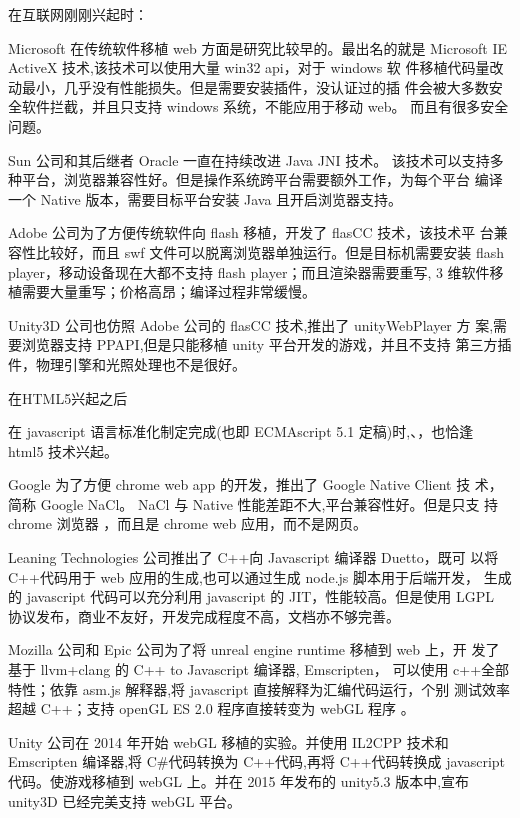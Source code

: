 在互联网刚刚兴起时：

Microsoft 在传统软件移植 web 方面是研究比较早的。最出名的就是
Microsoft IE ActiveX 技术,该技术可以使用大量 win32 api，对于 windows 软
件移植代码量改动最小，几乎没有性能损失。但是需要安装插件，没认证过的插
件会被大多数安全软件拦截，并且只支持 windows 系统，不能应用于移动 web。
而且有很多安全问题。

Sun 公司和其后继者 Oracle 一直在持续改进 Java JNI  技术。
该技术可以支持多种平台，浏览器兼容性好。但是操作系统跨平台需要额外工作，为每个平台
编译一个 Native 版本，需要目标平台安装 Java 且开启浏览器支持。

Adobe 公司为了方便传统软件向 flash 移植，开发了 flasCC 技术，该技术平
台兼容性比较好，而且 swf 文件可以脱离浏览器单独运行。但是目标机需要安装
flash player，移动设备现在大都不支持 flash player；而且渲染器需要重写,
3 维软件移植需要大量重写；价格高昂；编译过程非常缓慢。

Unity3D 公司也仿照 Adobe 公司的 flasCC 技术,推出了 unityWebPlayer 方
案,需要浏览器支持 PPAPI,但是只能移植 unity 平台开发的游戏，并且不支持
第三方插件，物理引擎和光照处理也不是很好。

在HTML5兴起之后

在 javascript 语言标准化制定完成(也即 ECMAscript 5.1 定稿)时,、，也恰逢
html5 技术兴起。

Google 为了方便 chrome web app 的开发，推出了 Google Native Client 技
术，简称 Google NaCl。
NaCl 与 Native 性能差距不大,平台兼容性好。但是只支
持 chrome 浏览器 ，而且是 chrome web 应用，而不是网页。

Leaning Technologies 公司推出了 C++向 Javascript 编译器 Duetto，既可
以将 C++代码用于 web 应用的生成,也可以通过生成 node.js 脚本用于后端开发，
生成的 javascript 代码可以充分利用 javascript 的 JIT，性能较高。但是使用
LGPL 协议发布，商业不友好，开发完成程度不高，文档亦不够完善。

Mozilla 公司和 Epic 公司为了将 unreal engine runtime 移植到 web 上，开
发了基于 llvm+clang 的 C++ to Javascript 编译器, Emscripten，
可以使用 c++全部特性；依靠 asm.js 解释器,将 javascript 直接解释为汇编代码运行，个别
测试效率超越 C++；支持 openGL ES 2.0 程序直接转变为 webGL 程序 。

Unity 公司在 2014 年开始 webGL 移植的实验。并使用 IL2CPP 技术和 Emscripten 编译器,将 C\#代码转换为 C++代码,再将 C++代码转换成 javascript 代码。使游戏移植到 webGL 上。并在 2015 年发布的 unity5.3 版本中,宣布 unity3D 已经完美支持 webGL 平台。


